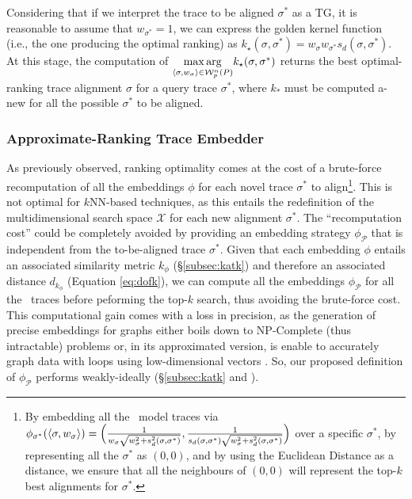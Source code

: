 {Considering that if we interpret the trace to be aligned $\sigma^*$ as a TG, it is reasonable to assume that $w_{\sigma^*}=1$, we can express the golden kernel function (i.e., the one producing the optimal ranking) as $k_\star(\sigma,\sigma^*)=w_\sigma w_{\sigma^*} s_d(\sigma,\sigma^*)$. At this stage, the computation of $\underset{\braket{\sigma,w_\sigma}\in \mathcal{W}_p^n(P)}{\max\arg} k_\star(\sigma, {\sigma^*})$ returns the best optimal-ranking trace alignment $\sigma$ for a query trace $\sigma^*$, where $k_\ast$ must be computed a-new for all the possible $\sigma^*$ to be aligned.
	
	
	

\subsubsection{Approximate-Ranking Trace Embedder}\label{subsec:ate}
As previously observed, ranking optimality comes at the cost of a brute-force recomputation of all the embeddings $\phi$ for each novel trace $\sigma^*$ to align\footnote{By embedding  all the \unravelled\ model traces via $\phi_{\sigma^*}(\braket{\sigma,w_\sigma})=\Big(\frac{1}{w_\sigma\sqrt{w_\sigma^2+s_d^2(\sigma,\sigma^*)}},\frac{1}{s_d(\sigma,\sigma^*)\sqrt{w_\sigma^2+s_d^2(\sigma,\sigma^*)}}\Big)$ over a specific $\sigma^*$, by representing all the $\sigma^*$ as $(0,0)$, and by using the Euclidean Distance as a distance, we ensure that all the neighbours of $(0,0)$ will represent the top-$k$ best alignments for $\sigma^*$.}. This is not optimal for $k$NN-based techniques, as this entails the  redefinition of the multidimensional search space $\mathcal{X}$ for each new alignment $\sigma^*$. The ``recomputation cost'' could be completely avoided by providing an embedding strategy $\phi_{\mathcal{P}}$ that is independent from the to-be-aligned trace $\sigma^*$. Given that each embedding $\phi$ entails an associated similarity metric $k_\phi$ (\S\ref{subsec:katk}) and therefore an associated distance $d_{k_\phi}$ (Equation \ref{eq:dofk}), we can compute all the embeddings $\phi_{\mathcal{P}}$ for all the \unravelled\ traces before peforming the top-$k$ search, thus avoiding the brute-force cost. This computational gain comes with a loss in precision, as the generation of precise embeddings for graphs either boils down to NP-Complete (thus intractable) problems \cite{GartnerFW03} or, in its approximated version, is enable to accurately graph data with loops using low-dimensional vectors \cite{Seshadhri5631}. So, our proposed definition of $\phi_{\mathcal{P}}$ performs  weakly-ideally (\S\ref{subsec:katk} and \cite{Gartner03}).

}

